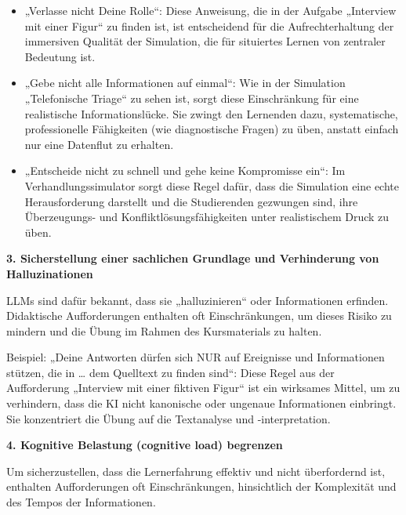 \documentclass[
  ngerman,
  letterpaper,
  DIV=11]{scrreprt}
\begin{document}
\begin{itemize}
\item
  „Verlasse nicht Deine Rolle``: Diese Anweisung, die in der Aufgabe
  „Interview mit einer Figur`` zu finden ist, ist entscheidend für die
  Aufrechterhaltung der immersiven Qualität der Simulation, die für
  situiertes Lernen von zentraler Bedeutung ist.
\item
  „Gebe nicht alle Informationen auf einmal``: Wie in der Simulation
  „Telefonische Triage`` zu sehen ist, sorgt diese Einschränkung für
  eine realistische Informationslücke. Sie zwingt den Lernenden dazu,
  systematische, professionelle Fähigkeiten (wie diagnostische Fragen)
  zu üben, anstatt einfach nur eine Datenflut zu erhalten.
\item
  „Entscheide nicht zu schnell und gehe keine Kompromisse ein``: Im
  Verhandlungssimulator sorgt diese Regel dafür, dass die Simulation
  eine echte Herausforderung darstellt und die Studierenden gezwungen
  sind, ihre Überzeugungs- und Konfliktlösungsfähigkeiten unter
  realistischem Druck zu üben.
\end{itemize}

\textbf{3. Sicherstellung einer sachlichen Grundlage und Verhinderung
von Halluzinationen}

LLMs sind dafür bekannt, dass sie „halluzinieren`` oder Informationen
erfinden. Didaktische Aufforderungen enthalten oft Einschränkungen, um
dieses Risiko zu mindern und die Übung im Rahmen des Kursmaterials zu
halten.

Beispiel: „Deine Antworten dürfen sich NUR auf Ereignisse und
Informationen stützen, die in \ldots{} dem Quelltext zu finden sind``:
Diese Regel aus der Aufforderung „Interview mit einer fiktiven Figur``
ist ein wirksames Mittel, um zu verhindern, dass die KI nicht kanonische
oder ungenaue Informationen einbringt. Sie konzentriert die Übung auf
die Textanalyse und -interpretation.

\textbf{4. Kognitive Belastung (cognitive load) begrenzen}

Um sicherzustellen, dass die Lernerfahrung effektiv und nicht
überfordernd ist, enthalten Aufforderungen oft Einschränkungen,
hinsichtlich der Komplexität und des Tempos der Informationen.
\end{document}
